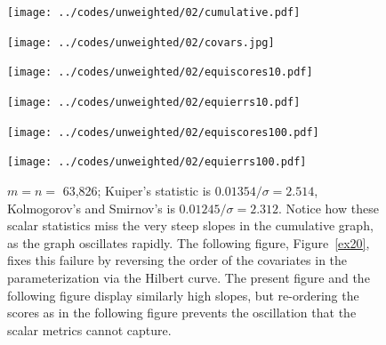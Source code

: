 \documentclass[]{fairmeta}
\begin{document}
\begin{figure}
\begin{centering}

\parbox{\imsize}{\texttt{[image: ../codes/unweighted/02/cumulative.pdf]}}
\quad\quad
\parbox{\imsize}{\texttt{[image: ../codes/unweighted/02/covars.jpg]}}

\vspace{\vertsep}

\parbox{\imsize}{\texttt{[image: ../codes/unweighted/02/equiscores10.pdf]}}
\quad\quad
\parbox{\imsize}{\texttt{[image: ../codes/unweighted/02/equierrs10.pdf]}}

\vspace{\vertsep}

\parbox{\imsize}{\texttt{[image: ../codes/unweighted/02/equiscores100.pdf]}}
\quad\quad
\parbox{\imsize}{\texttt{[image: ../codes/unweighted/02/equierrs100.pdf]}}

\end{centering}
\caption{$m = n =$ 63,826;
         Kuiper's statistic is $0.01354 / \sigma = 2.514$,
         Kolmogorov's and Smirnov's is $0.01245 / \sigma = 2.312$.
         Notice how these scalar statistics miss the very steep slopes
         in the cumulative graph, as the graph oscillates rapidly.
         The following figure, Figure~\ref{ex20}, fixes this failure
         by reversing the order of the covariates in the parameterization
         via the Hilbert curve. The present figure and the following figure
         display similarly high slopes, but re-ordering the scores
         as in the following figure prevents the oscillation that
         the scalar metrics cannot capture.
}
\label{ex02}
\end{figure}
\end{document}
